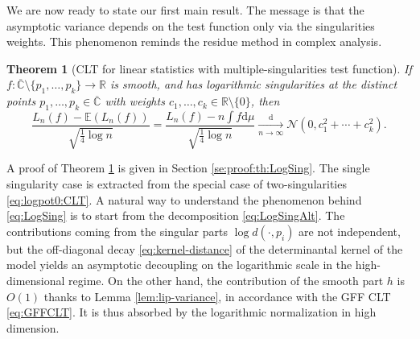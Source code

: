\documentclass[10pt,reqno]{amsart}
\numberwithin{equation}{section}
\numberwithin{figure}{section}
\theoremstyle{plain}
\newtheorem{theorem}{Theorem}[section]
\newcommand{\<}{\langle}
\renewcommand{\>}{\rangle}
\begin{document}
We are now ready to state our first main result. The message is that the asymptotic variance depends on the test function only via the singularities weights. This phenomenon reminds the residue method in complex analysis.

\begin{theorem}[CLT for linear statistics with multiple-singularities test function]\label{th:LogSing}
	If $f:\overline{\mathbb{C}}\setminus\{p_1,\ldots,p_k\}\to\mathbb{R}$ is smooth, and has logarithmic singularities at the distinct points $p_1,\dots,p_k \in \overline{\mathbb C}$
	with weights $c_1,\dots,c_k\in\mathbb{R}\setminus\{0\}$, then
    \begin{equation}\label{eq:LogSing}
      \frac{L_n(f)-\mathbb{E}(L_n(f))}{\sqrt{\frac{1}{4}\log n}}
      =\frac{L_n(f)-n\int f\mathrm d \mu}{\sqrt{\frac{1}{4}\log n}} 
      \xrightarrow[n \to \infty]{\mathrm{d}}
	   \mathcal{N}(0, c_1^2+\cdots+c_k^2).
    \end{equation}
\end{theorem}

A proof of Theorem \ref{th:LogSing} is given in Section \ref{se:proof:th:LogSing}. The single singularity case is extracted from the special case of two-singularities \eqref{eq:logpot0:CLT}. A natural way to understand the phenomenon behind \eqref{eq:LogSing} is to start from the decomposition \eqref{eq:LogSingAlt}. The contributions coming from the singular parts $\log d(\cdot,p_i)$ are not independent, but the off-diagonal decay \eqref{eq:kernel-distance} of the determinantal kernel of the model yields an asymptotic decoupling on the logarithmic scale in the high-dimensional regime. On the other hand, the contribution of the smooth part $h$ is $O(1)$ thanks to Lemma \ref{lem:lip-variance}, in accordance with the GFF CLT \eqref{eq:GFFCLT}. It is thus absorbed by the logarithmic normalization in high dimension.
\end{document}
